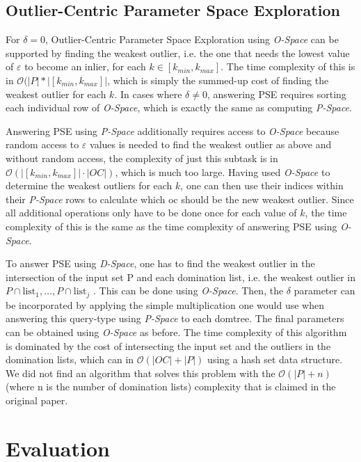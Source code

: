\documentclass[runningheads]{llncs}
\begin{document}
\subsection{Outlier-Centric Parameter Space Exploration}
 
For $\delta=0$, Outlier-Centric Parameter Space Exploration using \emph{O-Space} can be supported by finding the weakest outlier, i.e. the one that needs the lowest value of $\varepsilon$ to become an inlier, for each $k \in [k_{min},k_{max}]$. The time complexity of this is in $\mathcal{O}(|P| * |[k_{min}, k_{max}]|$, which is simply the summed-up cost of finding the weakest outlier for each $k$. In cases where $\delta \neq 0$, answering PSE requires sorting each individual row of \emph{O-Space}, which is exactly the same as computing \emph{P-Space}.

Answering PSE using \emph{P-Space} additionally requires access to \emph{O-Space} because random access to $\varepsilon$ values is needed to find the weakest outlier as above and without random access, the complexity of just this subtask is in $\mathcal{O}(|[k_{min},k_{max}]| \cdot |OC|)$, which is much too large. Having used \emph{O-Space} to determine the weakest outliers for each $k$, one can then use their indices within their \emph{P-Space} rows to calculate which oc should be the new weakest outlier. Since all additional operations only have to be done once for each value of $k$, the time complexity of this is the same as the time complexity of answering PSE using \emph{O-Space}.

To answer PSE using \emph{D-Space}, one has to find the weakest outlier in the intersection of the input set P and each domination list, i.e. the weakest outlier in $P \cap \text{list}_1, \ldots ,P\cap\text{list}_j$ . This can be done using \emph{O-Space}. Then, the $\delta$ parameter can be incorporated by applying the simple multiplication one would use when answering this query-type using \emph{P-Space} to each domtree. The final parameters can be obtained using \emph{O-Space} as before. The time complexity of this algorithm is dominated by the cost of intersecting the input set and the outliers in the domination lists, which can in $\mathcal{O}(|OC| + |P|)$ using a hash set data structure. We did not find an algorithm that solves this problem with the $\mathcal{O}(|P| + n)$ (where n is the number of domination lists) complexity that is claimed in the original paper.
\section{Evaluation}
\end{document}

